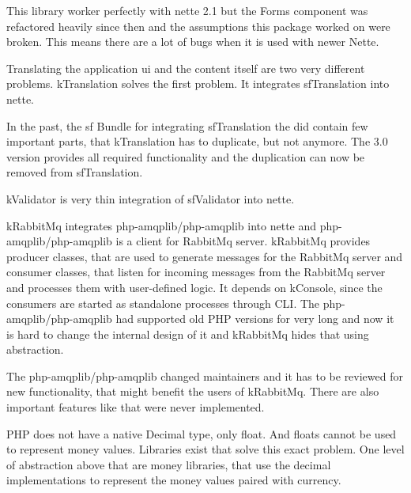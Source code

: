 This library worker perfectly with \gls{nette} 2.1 but the Forms component was refactored heavily since then and the assumptions this package worked on were broken. This means there are a lot of bugs when it is used with newer Nette.

 \label{sec:state:translation}

Translating the application \gls{ui} and the content itself are two very different problems. \gls{kTranslation} solves the first problem. It integrates \gls{sfTranslation} into \gls{nette}.

In the past, the \gls{sf} Bundle for integrating \gls{sfTranslation} the did contain few important parts, that \gls{kTranslation} has to duplicate, but not anymore. The 3.0 version provides all required functionality and the duplication can now be removed from \gls{sfTranslation}.

 \label{sec:state:validator}

\gls{kValidator} is very thin integration of \gls{sfValidator} into \gls{nette}.

 \label{sec:state:rabbit-mq}

\gls{kRabbitMq} integrates php-amqplib/php-amqplib into \gls{nette} and php-amqplib/php-amqplib is a client for RabbitMq server. \gls{kRabbitMq} provides producer classes, that are used to generate messages for the RabbitMq server and consumer classes, that listen for incoming messages from the RabbitMq server and processes them with user-defined logic. It depends on \gls{kConsole}, since the consumers are started as standalone processes through CLI. The php-amqplib/php-amqplib had supported old PHP versions for very long and now it is hard to change the internal design of it and \gls{kRabbitMq} hides that using abstraction.

The php-amqplib/php-amqplib changed maintainers and it has to be reviewed for new functionality, that might benefit the users of \gls{kRabbitMq}. There are also important features like  that were never implemented.

 \label{sec:state:money}

PHP does not have a native Decimal type, only float. And floats cannot be used to represent money values. Libraries exist that solve this exact problem. One level of abstraction above that are money libraries, that use the decimal implementations to represent the money values paired with currency.

